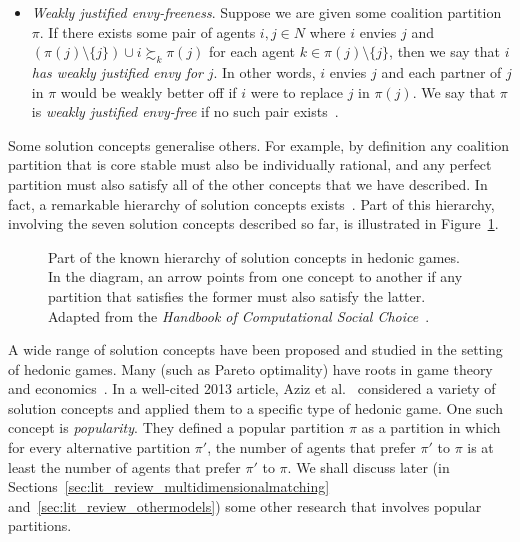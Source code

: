 \begin{itemize}
    \item \emph{Weakly justified envy-freeness}. Suppose we are given some coalition partition $\pi$. If there exists some pair of agents $i, j \in N$ where $i$ envies $j$ and $(\pi(j) \setminus \{ j \}) \cup i \succsim_k  \pi(j)$ for each agent $k \in \pi(j) \setminus \{ j \}$, then we say that $i$ \emph{has weakly justified envy for} $j$. In other words, $i$ envies $j$ and each partner of $j$ in $\pi$ would be weakly better off if $i$ were to replace $j$ in $\pi(j)$. We say that $\pi$ is \emph{weakly justified envy-free} if no such pair exists~\cite{BY19}.
\end{itemize}
Some solution concepts generalise others. For example, by definition any coalition partition that is core stable must also be individually rational, and any perfect partition must also satisfy all of the other concepts that we have described. In fact, a remarkable hierarchy of solution concepts exists~\cite{HedonicGamesHOCSC,AZIZ2013316,BY19}. Part of this hierarchy, involving the seven solution concepts described so far, is illustrated in Figure~\ref{fig:lit_review_hgsolutionconcepts}.

\begin{figure}
    \centering
    
    \caption[Part of the known hierarchy of solution concepts in hedonic games]{Part of the known hierarchy of solution concepts in hedonic games. In the diagram, an arrow points from one concept to another if any partition that satisfies the former must also satisfy the latter. Adapted from the \emph{Handbook of Computational Social Choice}~\cite{HedonicGamesHOCSC}.}
    \label{fig:lit_review_hgsolutionconcepts}
\end{figure}

A wide range of solution concepts have been proposed and studied in the setting of hedonic games. Many (such as Pareto optimality) have roots in game theory and economics~\cite{HedonicGamesHOCSC}. In a well-cited 2013 article, Aziz et al.~\cite{AZIZ2013316} considered a variety of solution concepts and applied them to a specific type of hedonic game. One such concept is \emph{popularity}. They defined a popular partition $\pi$ as a partition in which for every alternative partition $\pi'$, the number of agents that prefer $\pi'$ to $\pi$ is at least the number of agents that prefer $\pi'$ to $\pi$. We shall discuss later (in Sections~\ref{sec:lit_review_multidimensionalmatching} and~\ref{sec:lit_review_othermodels}) some other research that involves popular partitions.

